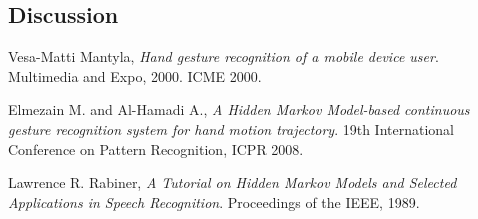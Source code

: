 \documentclass[twoside]{article}
\begin{document}
\begin{multicols}{2}

\section{Discussion}



\begin{thebibliography}{2} %

Vesa-Matti Mantyla, \emph{Hand gesture recognition of a mobile device user}. Multimedia and Expo, 2000. ICME 2000. 

Elmezain M. and Al-Hamadi A., \emph{A Hidden Markov Model-based continuous gesture recognition system for hand motion trajectory}. 19th International Conference on Pattern Recognition, ICPR 2008.

Lawrence R. Rabiner, \emph{A Tutorial on Hidden Markov Models and Selected Applications in Speech Recognition}. Proceedings of the IEEE, 1989.

\end{thebibliography}


\end{multicols}
\end{document}
